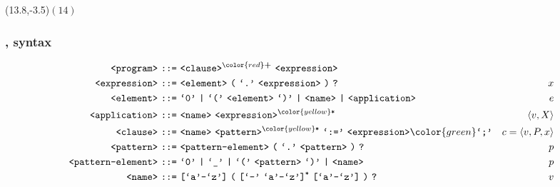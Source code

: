 \begin{frame}

\begin{textblock}{1}(13.8,-3.5)$(14)$\end{textblock}

\frametitle{\D{}, syntax}

\setcounter{equation}{0}

\begin{align*}
\nonterm{program}\ \textt{::=}&\ \nonterm{clause}^{\color{red}\textt{\bf +}}
\ \nonterm{expression}
& \\
\nonterm{expression}\ \textt{::=}&\ \nonterm{element}\ \textt{(}\ \term{.}
\ \nonterm{expression}\ \textt{)}\ \textt{?}
& x\\
\nonterm{element}\ \textt{::=}&\ \term{0}\ \textt{|}\ \term{(}
\ \nonterm{element}\ \term{)}\ \textt{|}\ \nonterm{name}\ \textt{|}
\ \nonterm{application}
& e\\
\nonterm{application}\ \textt{::=}&\ \nonterm{name}
\ \nonterm{expression}^{\color{yellow}\textt{*}}
& \left\langle v,X \right\rangle \\
\nonterm{clause}\ \textt{::=}&\ \nonterm{name}
\ \nonterm{pattern}^{\color{yellow}\textt{*}}\ \term{:=}
\ \nonterm{expression}{\color{green}\term{;}}
& c=\left\langle v, P, x \right\rangle \\
\nonterm{pattern}\ \textt{::=}&\ \nonterm{pattern-element}\ \textt{(}
\ \term{.}\ \nonterm{pattern}\ \textt{)}\ \textt{?}
& p\\
\nonterm{pattern-element}\ \textt{::=}&\ \term{0}\ \textt{|}\ \term{\_}
\ \textt{|}\ \term{(}\ \nonterm{pattern}\ \term{)}\ \textt{|}\ \nonterm{name}
& p\\
\nonterm{name}\ \textt{::=}&\ \textt{[}\term{a}\mathmono{-}\term{z}\textt{]}
\ \textt{(}\ \textt{[}\term{-}\ \term{a}\mathmono{-}\term{z}\textt{]}^\textt{*}
\ \textt{[}\term{a}\mathmono{-}\term{z}\textt{]}\ \textt{)}\ \textt{?}
& v
\end{align*}


\end{frame}

